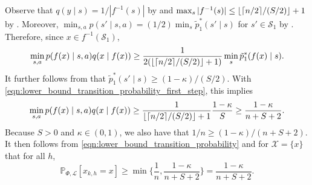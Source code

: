 \documentclass[11pt]{article}
\newcommand{\mcL}{\mathcal{L}}
\newcommand{\mcS}{\mathcal{S}}
\newcommand{\mcX}{\mathcal{X}}
\newcommand{\mbbP}{\mathbb{P}}
\DeclarePairedDelimiter\ceil{\lceil}{\rceil}
\DeclarePairedDelimiter\floor{\lfloor}{\rfloor}
\theoremstyle{definition}
\theoremstyle{definition}
\begin{document}
Observe that $q(y \mid s)=1/|f^{-1}(s)|$ by  and $\max_{s}|f^{-1}(s)|\leq \floor{\ceil{n/2}/(S/2)}+1$ by .
Moreover, $\min_{s,a}p(s'\mid s,a)=(1/2)\min_s\tilde{p}^*_1(s' \mid s)$ for $s'\in \mcS_1$ by .
Therefore, since $x\in f^{-1}(\mcS_1)$,
\begin{equation}
	\label{eqn:lower_bound_transition_probability_first_step}
	\min_{s,a}p(f(x)\mid s,a)q(x\mid f(x))
	\geq
	\frac{1}{2(\floor{\ceil{n/2}/(S/2)}+1)}
	\min_s\tilde{p}^*_1(f(x) \mid s)
	.
\end{equation}
It further follows from  that $\tilde{p}^*_1(s' \mid s)\geq (1-\kappa)/(S/2)$.
With \eqref{eqn:lower_bound_transition_probability_first_step}, this implies
\begin{equation}
	\label{eqn:lower_bound_transition_probability}
	\begin{split}
		\min_{s,a}p(f(x)\mid s,a)q(x\mid f(x))
		\geq
		\frac{1}{\floor{\ceil{n/2}/(S/2)}+1}
		\frac{1-\kappa}{S}
		\geq
		\frac{1-\kappa}{n+S+2}
		.
	\end{split}
\end{equation}
Because $S>0$ and $\kappa\in(0,1)$, we also have that $1/n \geq (1-\kappa)/(n+S+2)$.
It then follows from \eqref{eqn:lower_bound_transition_probability} and  for $\mcX=\{x\}$ that for all $h$,
\begin{equation}
	\label{eqn:visitation_rate_bound_context_specialized}
	\mbbP_{\Phi,\mcL}[x_{k,h}=x]
	\geq
	\min
	\biggl\{\frac{1}{n},\frac{1-\kappa}{n+S+2}\biggr\}
	=
	\frac{1-\kappa}{n+S+2}
	.
\end{equation}
\end{document}
